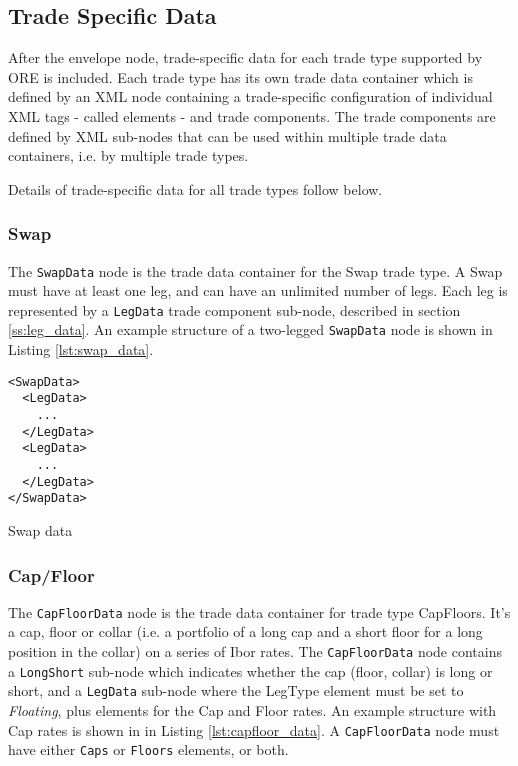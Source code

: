 \subsection{Trade Specific Data}

After the envelope node, trade-specific data for each trade type supported by
ORE is included. 
Each trade type has its own trade data container which is defined by an XML node containing a trade-specific
configuration of individual XML tags - called elements - and trade components. The trade components are defined by XML
sub-nodes that can be used within multiple trade data containers, i.e.  by multiple trade types.

\vspace{1em}

Details of  trade-specific data for all trade types follow below.

\subsubsection{Swap}

The \lstinline!SwapData! node is the trade data container for the Swap trade type. A Swap must have at least one leg,
and can have an unlimited number of legs. Each leg is represented by a \lstinline!LegData! trade component sub-node,
described in section \ref{ss:leg_data}. An example structure of a two-legged \lstinline!SwapData!
node is shown in Listing \ref{lst:swap_data}.

\begin{listing}[H]
\begin{verbatim}
<SwapData>
  <LegData>
    ...
  </LegData>
  <LegData>
    ...
  </LegData>
</SwapData>
\end{verbatim}
\caption{Swap data}
\label{lst:swap_data}
\end{listing}

\subsubsection{Cap/Floor}

The \lstinline!CapFloorData! node is the trade data container for trade type CapFloors.  It's a cap, floor or collar
(i.e. a portfolio of a long cap and a short floor for a long position in the collar) on a series of Ibor rates. The
\lstinline!CapFloorData! node contains a \lstinline!LongShort! sub-node which indicates whether the cap (floor, collar)
is long or short, and a \lstinline!LegData!  sub-node where the LegType element must be set to \emph{Floating}, plus
elements for the Cap and Floor rates. An example structure with Cap rates is shown in in Listing
\ref{lst:capfloor_data}. A \lstinline!CapFloorData! node must have either \lstinline!Caps! or \lstinline!Floors!
elements, or both.

